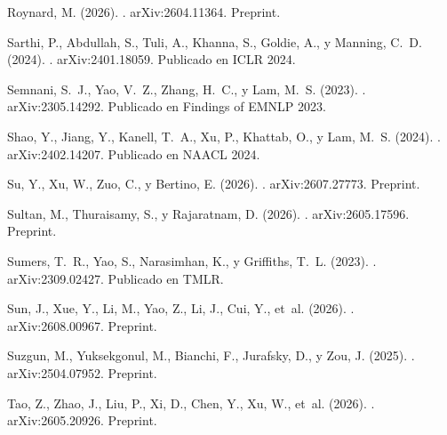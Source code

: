 \documentclass[11pt,letterpaper]{article}
\begin{document}
\begin{thebibliography}{}
Roynard, M. (2026).
.
\newblock arXiv:2604.11364. Preprint.

Sarthi, P., Abdullah, S., Tuli, A., Khanna, S., Goldie, A., y Manning, C.~D.
  (2024).
.
\newblock arXiv:2401.18059. Publicado en ICLR 2024.

Semnani, S.~J., Yao, V.~Z., Zhang, H.~C., y Lam, M.~S. (2023).
.
\newblock arXiv:2305.14292. Publicado en Findings of EMNLP 2023.

Shao, Y., Jiang, Y., Kanell, T.~A., Xu, P., Khattab, O., y Lam, M.~S. (2024).
.
\newblock arXiv:2402.14207. Publicado en NAACL 2024.

Su, Y., Xu, W., Zuo, C., y Bertino, E. (2026).
.
\newblock arXiv:2607.27773. Preprint.

Sultan, M., Thuraisamy, S., y Rajaratnam, D. (2026).
.
\newblock arXiv:2605.17596. Preprint.

Sumers, T.~R., Yao, S., Narasimhan, K., y Griffiths, T.~L. (2023).
.
\newblock arXiv:2309.02427. Publicado en TMLR.

Sun, J., Xue, Y., Li, M., Yao, Z., Li, J., Cui, Y., et~al. (2026).
.
\newblock arXiv:2608.00967. Preprint.

Suzgun, M., Yuksekgonul, M., Bianchi, F., Jurafsky, D., y Zou, J. (2025).
.
\newblock arXiv:2504.07952. Preprint.

Tao, Z., Zhao, J., Liu, P., Xi, D., Chen, Y., Xu, W., et~al. (2026).
.
\newblock arXiv:2605.20926. Preprint.


\end{thebibliography}
\end{document}
